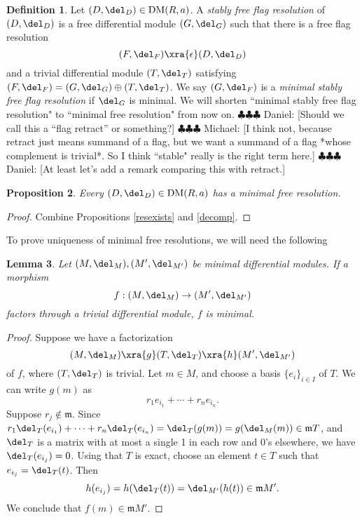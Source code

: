 \documentclass[12pt]{amsart}
\newtheorem{lemma}{Lemma}[section]
\newtheorem{prop}[lemma]{Proposition}
\theoremstyle{definition}
\newtheorem{defn}[lemma]{Definition}
\theoremstyle{remark}
\newcommand{\m}{\mathfrak m}
\newcommand{\daniel}[1]{{\color{blue} \sf $\clubsuit\clubsuit\clubsuit$ Daniel: [#1]}}
\newcommand{\michael}[1]{{\color{red} \sf $\clubsuit\clubsuit\clubsuit$ Michael: [#1]}}
\def\DM{\operatorname{DM}}
\begin{document}
\begin{defn}
Let $(D, \del_D) \in \DM(R, a)$. A \emph{stably free flag resolution} of $(D, \del_D)$ is a free differential module $(G, \del_G)$ such that there is a free flag resolution
$$
(F, \del_F) \xra{\epsilon} (D,\del_D)
$$
and a trivial differential module $(T, \del_T)$ satisfying $(F, \del_F) = (G, \del_G) \oplus (T, \del_T)$. We say $(G, \del_F)$ is a \emph{minimal stably free flag resolution} if $\del_G$ is minimal. We will shorten ``minimal stably free flag resolution" to ``minimal free resolution" from now on.
\daniel{Should we call this a ``flag retract'' or something?}\michael{I think not, because retract just means summand of a flag, but we want a summand of a flag *whose complement is trivial*. So I think ``stable" really is the right term here.}
\daniel{At least let's add a remark comparing this with retract.}
\end{defn}


\begin{prop}
Every $(D, \del_D) \in \DM(R, a)$ has a minimal free resolution.
\end{prop}

\begin{proof}
Combine Propositions \ref{resexists} and \ref{decomp}.
\end{proof}

To prove uniqueness of minimal free resolutions, we will need the following

\begin{lemma}
\label{factors}
Let $(M, \del_M), (M', \del_{M'})$ be minimal differential modules. If a morphism
$$
f : (M, \del_M) \to (M', \del_{M'})
$$
factors through a trivial differential module, $f$ is minimal.
\end{lemma}

\begin{proof}
Suppose we have a factorization
$$
(M, \del_M)  \xra{g} (T, \del_T) \xra{h} (M', \del_{M'})
$$
of $f$, where $(T, \del_T)$ is trivial. Let $m \in M$, and choose a basis $\{e_i\}_{i \in I}$ of $T$. We can write $g(m)$ as
$$
r_1 e_{i_1} + \cdots + r_n e_{i_n}.
$$
Suppose $r_j \notin \m$. Since $ r_1 \del_T(e_{i_1}) + \cdots + r_n \del_T(e_{i_n}) =  \del_T(g(m)) = g(\del_M(m))  \in \m T$, and $\del_T$ is a matrix with at most a single 1 in each row and 0's elsewhere, we have $\del_T(e_{i_j}) = 0$. Using that $T$ is exact, choose an element $t \in T$ such that $e_{i_j} = \del_T(t)$. Then
$$
h(e_{i_j}) = h(\del_T(t)) = \del_{M'}(h(t)) \in \m M'.
$$
We conclude that $f(m) \in \m M'$.
\end{proof}
\end{document}
